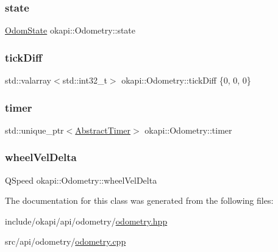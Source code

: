 \mbox{\label{classokapi_1_1Odometry_a63165b62b596c34c1965f674f57aae5f}} 
\subsubsection{\texorpdfstring{state}{state}}
{\footnotesize\ttfamily \mbox{\hyperlink{structokapi_1_1OdomState}{Odom\+State}} okapi\+::\+Odometry\+::state\hspace{0.3cm}{\ttfamily [protected]}}

\mbox{\label{classokapi_1_1Odometry_a28be79e0e646d4dcfc831896c61d81fc}} 
\subsubsection{\texorpdfstring{tickDiff}{tickDiff}}
{\footnotesize\ttfamily std\+::valarray$<$std\+::int32\+\_\+t$>$ okapi\+::\+Odometry\+::tick\+Diff \{0, 0, 0\}\hspace{0.3cm}{\ttfamily [protected]}}

\mbox{\label{classokapi_1_1Odometry_aedf3fb84bba92fbaf2fc9dfe8d91fd20}} 
\subsubsection{\texorpdfstring{timer}{timer}}
{\footnotesize\ttfamily std\+::unique\+\_\+ptr$<$\mbox{\hyperlink{classokapi_1_1AbstractTimer}{Abstract\+Timer}}$>$ okapi\+::\+Odometry\+::timer\hspace{0.3cm}{\ttfamily [protected]}}

\mbox{\label{classokapi_1_1Odometry_acebfb2e25552de9062dd824fcccfb50e}} 
\subsubsection{\texorpdfstring{wheelVelDelta}{wheelVelDelta}}
{\footnotesize\ttfamily Q\+Speed okapi\+::\+Odometry\+::wheel\+Vel\+Delta\hspace{0.3cm}{\ttfamily [protected]}}



The documentation for this class was generated from the following files\+:\begin{DoxyCompactItemize}
\item 
include/okapi/api/odometry/\mbox{\hyperlink{odometry_8hpp}{odometry.\+hpp}}\item 
src/api/odometry/\mbox{\hyperlink{odometry_8cpp}{odometry.\+cpp}}\end{DoxyCompactItemize}
